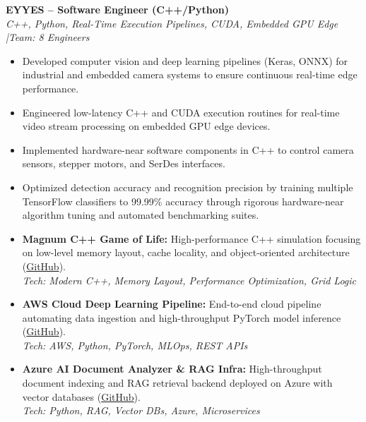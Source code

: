 \documentclass[10pt,a4paper]{article}
\begin{document}
\vspace{0.15cm}
\textbf{EYYES -- Software Engineer (C++/Python)} \\
\textit{C++, Python, Real-Time Execution Pipelines, CUDA, Embedded GPU Edge \quad|\quad Team: 8 Engineers}
\begin{itemize}
    \item Developed computer vision and deep learning pipelines (Keras, ONNX) for industrial and embedded camera systems to ensure continuous real-time edge performance.
    \item Engineered low-latency C++ and CUDA execution routines for real-time video stream processing on embedded GPU edge devices.
    \item Implemented hardware-near software components in C++ to control camera sensors, stepper motors, and SerDes interfaces.
    \item Optimized detection accuracy and recognition precision by training multiple TensorFlow classifiers to 99.99\% accuracy through rigorous hardware-near algorithm tuning and automated benchmarking suites.
\end{itemize}



\begin{itemize}[leftmargin=1.5em, itemsep=0.2em]
    \item \textbf{Magnum C++ Game of Life:} High-performance C++ simulation focusing on low-level memory layout, cache locality, and object-oriented architecture (\href{https://github.com/CodeByMaxx/magnum-game-of-life}{GitHub}).\\
    \textit{Tech: Modern C++, Memory Layout, Performance Optimization, Grid Logic}
    \item \textbf{AWS Cloud Deep Learning Pipeline:} End-to-end cloud pipeline automating data ingestion and high-throughput PyTorch model inference (\href{https://github.com/CodeByMaxx/aws-pneumonia-detection}{GitHub}).\\
    \textit{Tech: AWS, Python, PyTorch, MLOps, REST APIs}
    \item \textbf{Azure AI Document Analyzer \& RAG Infra:} High-throughput document indexing and RAG retrieval backend deployed on Azure with vector databases (\href{https://github.com/CodeByMaxx/AI-Document-Analyzer}{GitHub}).\\
    \textit{Tech: Python, RAG, Vector DBs, Azure, Microservices}
\end{itemize}
\end{document}

